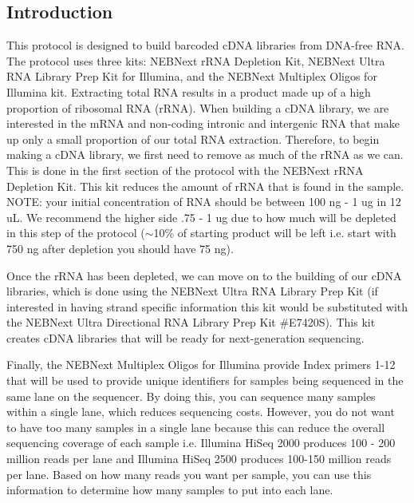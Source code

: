 \documentclass[11pt, oneside]{article}
\begin{document}
	\vspace{3mm}
	
	\subsection{Introduction}
	
	\vspace{2mm}
	
	\noindent This protocol is designed to build barcoded cDNA libraries from DNA-free RNA. The protocol uses three kits: NEBNext rRNA Depletion Kit, 	NEBNext Ultra RNA Library Prep Kit for Illumina, and the NEBNext Multiplex Oligos for Illumina kit. Extracting total RNA results in a product made up of 	a high proportion of ribosomal RNA (rRNA). When building a cDNA library, we are interested in the mRNA and non-coding intronic and intergenic RNA 	that make up only a small proportion of our total RNA extraction. Therefore, to begin making a cDNA library, we first need to remove as much of the 		rRNA as we can. This is done in the first section of the protocol with the NEBNext rRNA Depletion Kit. This kit reduces the amount of rRNA that is found 	in the sample. NOTE: your initial concentration of RNA should be between 100 ng - 1 ug in 12 uL. We recommend the higher side .75 - 1 ug due to how 	much will be depleted in this step of the protocol ($\sim$10\% of starting product will be left i.e. start with 750 ng after depletion you should have 75 ng). 
	
	\vspace{2mm}
	
	\noindent Once the rRNA has been depleted, we can move on to the building of our cDNA libraries, which is done using the NEBNext Ultra RNA Library 	Prep Kit (if interested in having strand specific information this kit would be substituted with the NEBNext Ultra Directional RNA Library Prep Kit 		\#E7420S). This kit creates cDNA libraries that will be ready for next-generation sequencing. 
	
	\vspace{2mm}
	
	\noindent Finally, the NEBNext Multiplex Oligos for Illumina provide Index primers 1-12 that will be used to provide unique identifiers for samples being 	sequenced in the same lane on the sequencer. By doing this, you can sequence many samples within a single lane, which reduces sequencing costs. 	However, you do not want to have too many samples in a single lane because this can reduce the overall sequencing coverage of each sample i.e. 		Illumina HiSeq 	2000 produces 100 - 200 million reads per lane and Illumina HiSeq 2500 produces 100-150 million reads per lane. Based on how many 	reads you want per sample, you can use this information to determine how many samples to put into each lane. 
	
\end{document}
